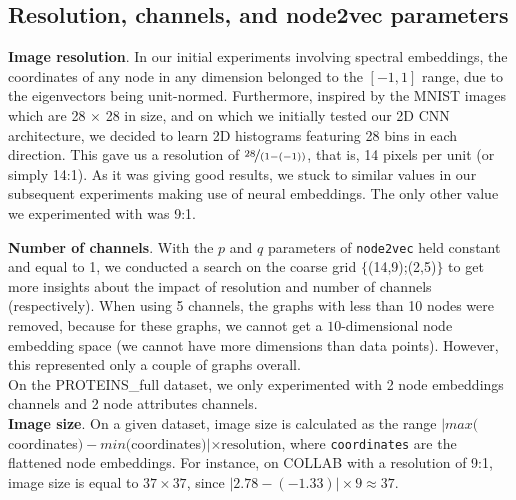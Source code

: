 \documentclass[sigconf]{acmart}
\begin{document}
\subsection{Resolution, channels, and node2vec parameters}
\textbf{Image resolution}. In our initial experiments involving spectral embeddings, the coordinates of any node in any dimension belonged to the $[-1,1]$ range, due to the eigenvectors being unit-normed. Furthermore, inspired by the MNIST images which are 28 $\times$ 28 in size, and on which we initially tested our 2D CNN architecture, we decided to learn 2D histograms featuring 28 bins in each direction. This gave us a resolution of $\nicefrac{28}{(1-(-1))}$, that is, 14 pixels per unit (or simply 14:1). As it was giving good results, we stuck to similar values in our subsequent experiments making use of neural embeddings. The only other value we experimented with was 9:1.

\textbf{Number of channels}. With the $p$ and $q$ parameters of \texttt{node2vec} held constant and equal to 1, we conducted a search on the coarse grid $\big\{$(14,9);(2,5)$\big\}$ to get more insights about the impact of resolution and number of channels (respectively). When using 5 channels, the graphs with less than 10 nodes were removed, because for these graphs, we cannot get a $10$-dimensional node embedding space (we cannot have more dimensions than data points). However, this represented only a couple of graphs overall. \\ 
On the PROTEINS\_full dataset, we only experimented with 2 node embeddings channels and 2 node attributes channels. \\
\textbf{Image size}. On a given dataset, image size is calculated as the range \newline $|max($coordinates$) - min($coordinates$)| \times  \mathrm{resolution}$, where \texttt{coordinates} are the flattened node embeddings. For instance, on COLLAB with a resolution of 9:1, image size is equal to $37 \times 37$, since $|2.78-(-1.33)| \times 9 \approx 37$. 
\end{document}

